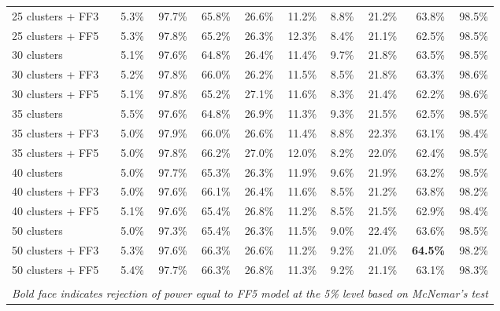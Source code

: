 \begin{table}[!h]
\begin{center}
\begin{tabular}{lrrrrrrrrr}
25 clusters + FF3	& 5.3\% & 97.7\% & 65.8\% & 26.6\% & 11.2\% & 8.8\% & 21.2\% & 63.8\% & 98.5\% \\
25 clusters + FF5	& 5.3\% & 97.8\% & 65.2\% & 26.3\% & 12.3\% & 8.4\% & 21.1\% & 62.5\% & 98.5\% \\
30 clusters	& 5.1\% & 97.6\% & 64.8\% & 26.4\% & 11.4\% & 9.7\% & 21.8\% & 63.5\% & 98.5\% \\
30 clusters + FF3	& 5.2\% & 97.8\% & 66.0\% & 26.2\% & 11.5\% & 8.5\% & 21.8\% & 63.3\% & 98.6\% \\
30 clusters + FF5	& 5.1\% & 97.8\% & 65.2\% & 27.1\% & 11.6\% & 8.3\% & 21.4\% & 62.2\% & 98.6\% \\
35 clusters	& 5.5\% & 97.6\% & 64.8\% & 26.9\% & 11.3\% & 9.3\% & 21.5\% & 62.5\% & 98.5\% \\
35 clusters + FF3	& 5.0\% & 97.9\% & 66.0\% & 26.6\% & 11.4\% & 8.8\% & 22.3\% & 63.1\% & 98.4\% \\
35 clusters + FF5	& 5.0\% & 97.8\% & 66.2\% & 27.0\% & 12.0\% & 8.2\% & 22.0\% & 62.4\% & 98.5\% \\
40 clusters	& 5.0\% & 97.7\% & 65.3\% & 26.3\% & 11.9\% & 9.6\% & 21.9\% & 63.2\% & 98.5\% \\
40 clusters + FF3	& 5.0\% & 97.6\% & 66.1\% & 26.4\% & 11.6\% & 8.5\% & 21.2\% & 63.8\% & 98.2\% \\
40 clusters + FF5	& 5.1\% & 97.6\% & 65.4\% & 26.8\% & 11.2\% & 8.5\% & 21.5\% & 62.9\% & 98.4\% \\
50 clusters	& 5.0\% & 97.3\% & 65.4\% & 26.3\% & 11.5\% & 9.0\% & 22.4\% & 63.6\% & 98.5\% \\
50 clusters + FF3	& 5.3\% & 97.6\% & 66.3\% & 26.6\% & 11.2\% & 9.2\% & 21.0\% & \textbf{64.5\%} & 98.2\% \\
50 clusters + FF5	& 5.4\% & 97.7\% & 66.3\% & 26.8\% & 11.3\% & 9.2\% & 21.1\% & 63.1\% & 98.3\% \\
\hline\\
\multicolumn{10}{l}{\itshape Bold face indicates rejection of power equal to FF5 model at the 5\% level based on McNemar's test}
    \end{tabular}
    \end{center}
\end{table}
